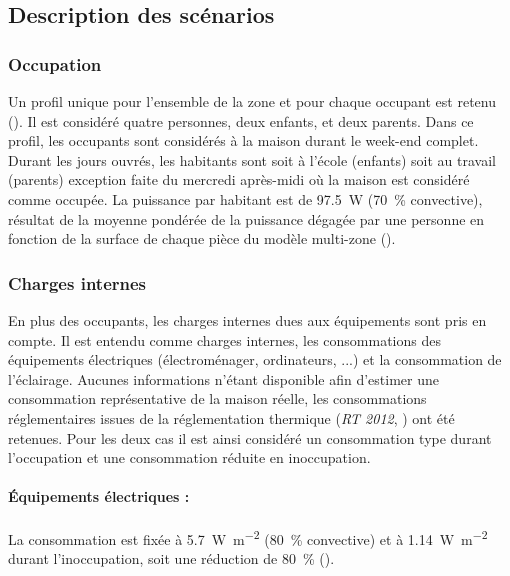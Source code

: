 \subsection{Description des scénarios} %
\label{sub:description_des_scenarios}
\subsubsection{Occupation} %
\label{ssub:profil_d_occupation}
Un profil unique pour l’ensemble de la zone et pour chaque occupant est retenu (). Il est considéré quatre personnes, deux enfants, et deux parents. Dans ce profil,
les occupants sont considérés à la maison durant le week-end complet. Durant les jours
ouvrés, les habitants sont soit à l’école (enfants) soit au travail (parents) exception
faite du mercredi après-midi où la maison est considéré comme occupée.
La puissance par habitant est de \SI{97.5}{\watt} (\SI{70}{\percent} convective), résultat
de la moyenne pondérée de la puissance dégagée par une personne en fonction de la surface
de chaque pièce du modèle multi-zone ().




\subsubsection{Charges internes} %
\label{ssub:charges_internes}
En plus des occupants, les charges internes dues aux équipements sont pris en compte.
Il est entendu comme charges internes, les consommations des équipements électriques
(électroménager, ordinateurs, ...) et la consommation de l’éclairage. Aucunes informations
n’étant disponible afin d’estimer une consommation représentative de la maison réelle,
les consommations réglementaires issues de la réglementation thermique (\emph{RT 2012}, \cite{CSTB2011})
ont été retenues. Pour les deux cas il est ainsi considéré un consommation type durant
l’occupation et une consommation réduite en inoccupation.

\paragraph{Équipements électriques :} %
\label{par:equipements_electriques}
La consommation est fixée à \SI{5.7}{\watt\per m^{2}} (\SI{80}{\percent}
convective) et à \SI{1.14}{\watt\per m^{2}} durant l’inoccupation, soit une
réduction de \SI{80}{\percent} ().

